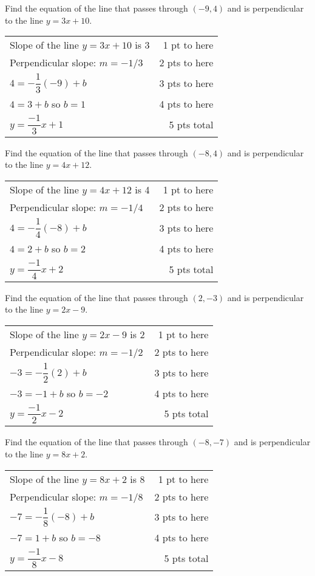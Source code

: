 {
	Find the equation of the line that passes through $(-9,4)$ and is perpendicular to the line $y=3x+10$.
}
{
	\begin{tabular}{l r}
	Slope of the line $y=3x+10$ is 3 & 1 pt to here \\
	Perpendicular slope:  $m= -1/3$ & 2 pts to here\\
	$4 = -\dfrac{1}{3}(-9) + b$  & 3 pts to here\\   
	$4 =  3 + b$ so $b = 1$ & 4 pts to here \\
	$y=\dfrac{-1}{3} x+1$ & 5 pts total
	\end{tabular}
}

{
	Find the equation of the line that passes through $(-8,4)$ and is perpendicular to the line $y=4x+12$.
}
{
	\begin{tabular}{l r}
	Slope of the line $y=4x+12$ is 4 & 1 pt to here \\
	Perpendicular slope: $m= -1/4$ & 2 pts to here\\
	$4 = -\dfrac{1}{4}(-8) + b$ &  3 pts to here\\
	$4 =  2 + b$ so $b = 2$ & 4 pts to here\\
	$y=\dfrac{-1}{4} x+2$     & 5 pts total\\
	\end{tabular}
}

{
	Find the equation of the line that passes through $(2,-3)$ and is perpendicular to the line $y=2x-9$.
}
{
	\begin{tabular}{l r}
	Slope of the line $y=2x-9$ is 2 & 1 pt to here \\
	Perpendicular slope: $m= -1/2$ & 2 pts to here\\
	$-3 = -\dfrac{1}{2}(2) + b$ &  3 pts to here\\
	$-3=  -1 + b$ so $b = -2$ & 4 pts to here\\
	$y=\dfrac{-1}{2} x-2$     & 5 pts total\\
	\end{tabular}
}

{
	Find the equation of the line that passes through $(-8,-7)$ and is perpendicular to the line $y=8x+2$.
}
{
	\begin{tabular}{l r}
	Slope of the line $y=8x+2$ is $8$ & 1 pt to here \\
	Perpendicular slope: $m=-1/8$ & 2 pts to here\\
	$-7 = -\dfrac{1}{8}(-8) + b$ &  3 pts to here\\
	$-7=  1 + b$ so $b = -8$ & 4 pts to here\\
	$y=\dfrac{-1}{8}x-8$     & 5 pts total\\
	\end{tabular}
}
